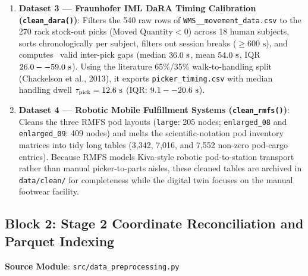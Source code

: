 \documentclass[11pt,a4paper]{article}
\begin{document}
\begin{enumerate}[leftmargin=*]
    \item \textbf{Dataset 3 --- Fraunhofer IML DaRA Timing Calibration (\texttt{clean\_dara()})}:
    Filters the 540 raw rows of \texttt{WMS\_\_movement\_data.csv} to the 270 rack stock-out picks ($\text{Moved Quantity} < 0$) across 18 human subjects, sorts chronologically per subject, filters out session breaks ($\ge 600\text{ s}$), and computes \DaRAValidGaps~valid inter-pick gaps (median $36.0\text{ s}$, mean $54.0\text{ s}$, IQR $26.0--59.0\text{ s}$). Using the literature 65\%/35\% walk-to-handling split (Chackelson et al., 2013), it exports \texttt{picker\_timing.csv} with median handling dwell $\tau_{\text{pick}} = 12.6\text{ s}$ (IQR: $9.1--20.6\text{ s}$).

    \item \textbf{Dataset 4 --- Robotic Mobile Fulfillment Systems (\texttt{clean\_rmfs()})}:
    Cleans the three RMFS pod layouts (\texttt{large}: 205 nodes; \texttt{enlarged\_08} and \texttt{enlarged\_09}: 409 nodes) and melts the scientific-notation pod inventory matrices into tidy long tables (3,342, 7,016, and 7,552 non-zero pod-cargo entries). Because RMFS models Kiva-style robotic pod-to-station transport rather than manual picker-to-parts aisles, these cleaned tables are archived in \texttt{data/clean/} for completeness while the digital twin focuses on the manual footwear facility.
\end{enumerate}

\subsection{Block 2: Stage 2 Coordinate Reconciliation and Parquet Indexing}
\noindent\textbf{Source Module}: \texttt{src/data\_preprocessing.py}\\[0.5em]
\end{document}
